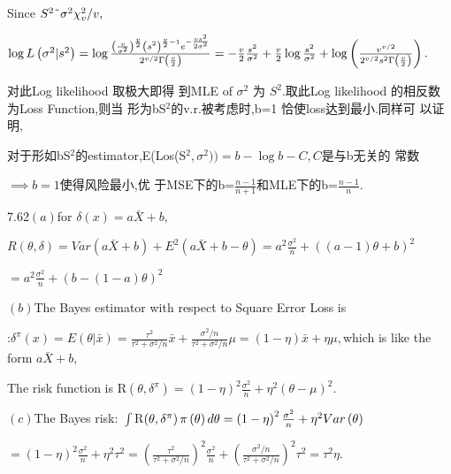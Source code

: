 \documentclass{ctexart}
\begin{document}
Since $S^{2}\symbol{126}\sigma ^{2}\chi _{v}^{2}/v,$

$\log L\left( \sigma ^{2}|s^{2}\right) =\log \frac{\left( \frac{v}{\sigma
^{2}}\right) ^{\frac{v}{2}}\left( s^{2}\right) ^{\frac{v}{2}-1}e^{-\frac{%
vs^{2}}{2\sigma ^{2}}}}{2^{v/2}\Gamma \left( \frac{v}{2}\right) }=-\frac{v}{2%
}\frac{s^{2}}{\sigma ^{2}}+\frac{v}{2}\log \frac{s^{2}}{\sigma ^{2}}+\log
\left( \frac{v^{v/2}}{2^{v/2}s^{2}\Gamma \left( \frac{v}{2}\right) }\right)
. $

对此Log likelihood 取极大即得%
到MLE of $\sigma ^{2}$ 为 $S^{2}.$取此Log likelihood%
的相反数为Loss Function,则当%
形为bS$^{2}$的v.r.被考虑时,b=1%
恰使loss达到最小.同样可%
以证明,

对于形如bS$^{2}$的estimator,E(Los(S$%
^{2},\sigma ^{2}))=b-\log b-C,C$是与b无关的%
常数

$\implies b=1$使得风险最小,优%
于MSE下的b=$\frac{n-1}{n+1}$和MLE下的b=$%
\frac{n-1}{n}.$

7.62$\left( a\right) $for $\delta \left( x\right) =a\bar{X}+b,$

$R\left( \theta ,\delta \right) =Var\left( a\bar{X}+b\right) +E^{2}\left( a%
\bar{X}+b-\theta \right) =a^{2}\frac{\sigma ^{2}}{n}+\left( \left(
a-1\right) \theta +b\right) ^{2}$

$=a^{2}\frac{\sigma ^{2}}{n}+\left( b-\left( 1-a\right) \theta \right) ^{2}$

$\left( b\right) $The Bayes estimator with respect to Square Error Loss is

:$\delta ^{\pi }\left( x\right) =E\left( \theta |\bar{x}\right) =\frac{\tau
^{2}}{\tau ^{2}+\sigma ^{2}/n}\bar{x}+\frac{\sigma ^{2}/n}{\tau ^{2}+\sigma
^{2}/n}\mu =\left( 1-\eta \right) \bar{x}+\eta \mu ,$which is like the form $%
a\bar{X}+b,$

The risk function is R$\left( \theta ,\delta ^{\pi }\right) =\left( 1-\eta
\right) ^{2}\frac{\sigma ^{2}}{n}+\eta ^{2}\left( \theta -\mu \right) ^{2}.$

$\left( c\right) $The Bayes risk: $\int $R$\left( \theta ,\delta ^{\pi
}\right) \pi \left( \theta \right) d\theta =\left( 1-\eta \right) ^{2}\frac{%
\sigma ^{2}}{n}+\eta ^{2}Var\left( \theta \right) $

$=\left( 1-\eta \right) ^{2}\frac{\sigma ^{2}}{n}+\eta ^{2}\tau ^{2}=\left( 
\frac{\tau ^{2}}{\tau ^{2}+\sigma ^{2}/n}\right) ^{2}\frac{\sigma ^{2}}{n}%
+\left( \frac{\sigma ^{2}/n}{\tau ^{2}+\sigma ^{2}/n}\right) ^{2}\tau
^{2}=\tau ^{2}\eta .$
\end{document}
